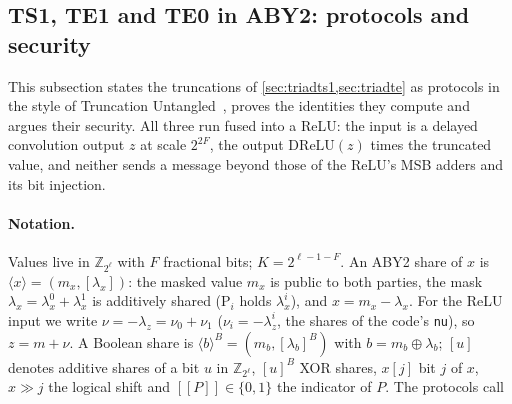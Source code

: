 \subsection{TS1, TE1 and TE0 in ABY2: protocols and security}\label{sec:truncformal}

This subsection states the truncations of \cref{sec:triadts1,sec:triadte} as protocols in the style of Truncation
Untangled~\cite{tu}, proves the identities they compute and argues their security. All three run fused into a ReLU:
the input is a delayed convolution output $z$ at scale $2^{2F}$, the output $\mathrm{DReLU}(z)$ times the truncated
value, and neither sends a message beyond those of the ReLU's MSB adders and its bit injection.

\paragraph{Notation.} Values live in $\mathbb{Z}_{2^\ell}$ with $F$ fractional bits; $K = 2^{\ell-1-F}$. An ABY2 share
of $x$ is $\langle x \rangle = (m_x, [\lambda_x])$: the masked value $m_x$ is public to both parties, the mask
$\lambda_x = \lambda_x^0 + \lambda_x^1$ is additively shared (P$_i$ holds $\lambda_x^i$), and $x = m_x - \lambda_x$. For
the ReLU input we write $\nu = -\lambda_z = \nu_0 + \nu_1$ ($\nu_i = -\lambda_z^i$, the shares of the code's
\texttt{nu}), so $z = m + \nu$. A Boolean share is $\langle b \rangle^B = (m_b, [\lambda_b]^B)$ with
$b = m_b \oplus \lambda_b$; $[u]$ denotes additive shares of a bit $u$ in $\mathbb{Z}_{2^\ell}$, $[u]^B$ XOR shares,
$x[j]$ bit $j$ of $x$, $x \gg j$ the logical shift and $[\![P]\!] \in \{0, 1\}$ the indicator of $P$. The protocols call
